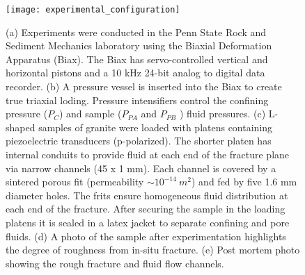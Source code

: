 \documentclass[letterpaper,10pt]{article}
\begin{document}
\newpage

\begin{figure}[ht]
	\centering
	\texttt{[image: experimental\_configuration]}
	\caption[]{(a) Experiments were conducted in the Penn State Rock and Sediment Mechanics laboratory using the Biaxial Deformation Apparatus (Biax). The Biax has servo-controlled vertical and horizontal pistons and a 10 kHz 24-bit analog to digital data recorder. (b) A pressure vessel is inserted into the Biax to create true triaxial loding. Pressure intensifiers control the confining pressure ($P_C$) and sample ($P_{PA}$ and $P_{PB}$ ) fluid pressures. (c) L-shaped samples of granite were loaded with platens containing piezoelectric transducers (p-polarized). The shorter platen has internal conduits to provide fluid at each end of the fracture plane via narrow channels (45 x 1 mm). Each channel is covered by a sintered porous fit (permeability $\sim 10^{-14}\ m^2$) and fed by five 1.6 mm diameter holes. The frits ensure homogeneous fluid distribution at each end of the fracture. After securing the sample in the loading platens it is sealed in a latex jacket to separate confining and pore fluids. (d) A photo of the sample after experimentation highlights the degree of roughness from in-situ fracture. (e) Post mortem photo showing the rough fracture and fluid flow channels. }
	\label{fig:samplesetup}
\end{figure}

\newpage
\end{document}
